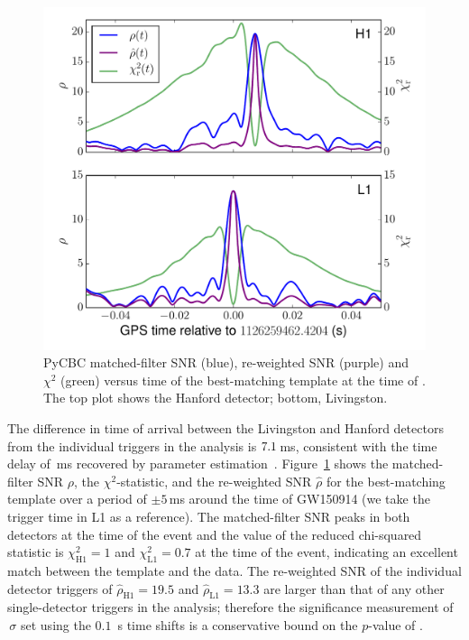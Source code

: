 \begin{figure}[t]
\includegraphics[width=\textwidth]{figs/chapter2/combined_single.pdf}
\caption{\label{fig:pycbc_gstlal_snr_chisq_vs_time}
PyCBC matched-filter SNR (blue), re-weighted SNR (purple) and $\chi^2$
(green) versus time of the best-matching template at the time of \TheEvent.
The top plot shows the Hanford detector; bottom, Livingston.
}
\end{figure}

The difference in time of arrival between the Livingston and Hanford detectors
from the individual triggers in the \pycbc{} analysis is
$7.1\,$ms, consistent with the time delay of
\TIMEDELAYCOMPACT\,ms recovered by parameter
estimation~\cite{GW150914-PARAMESTIM}.
Figure~\ref{fig:pycbc_gstlal_snr_chisq_vs_time} shows the
matched-filter SNR $\rho$, the $\chi^2$-statistic, and the re-weighted SNR
$\hat\rho$ for the best-matching template over a period of $\pm5$\,ms around
the time of GW150914 (we take the \pycbc{} trigger time in L1 as a reference).
The matched-filter SNR peaks in both detectors at the time of the event and
the value of the reduced chi-squared statistic is $\chi^2_\mathrm{H1} = 1$ and
$\chi^2_\mathrm{L1} = 0.7$ at the time of the event, indicating an excellent
match between the template and the data. The re-weighted SNR of the individual
detector triggers of $\hat{\rho}_\mathrm{H1} = 19.5$ and
$\hat{\rho}_\mathrm{L1} = 13.3$ are larger than that of any other
single-detector triggers in the analysis; therefore the significance
measurement of \CBCEVENTSIGMA $\,\sigma$ set using the $0.1$~s time shifts is
a conservative bound on the $p$-value of \TheEvent.

